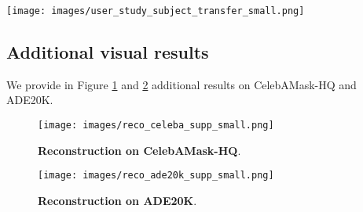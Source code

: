 \documentclass[runningheads]{llncs}
\begin{document}
\begin{figure*}[t!]
    \centering
    \texttt{[image: images/user\_study\_subject\_transfer\_small.png]}
     \caption{
     \small{\textbf{User study on subject transfer}. 
     We provide here the samples that were used to evaluate the subject quality on SCAM, SEAN and INADE in a user study. Note that we provide here the segmentation mask for reference but it was not provided to users.
     }}
    \label{fig:user_study_st}
\end{figure*}

\subsection{Additional visual results}
We provide in Figure \ref{fig:reco_celeb_supp} and \ref{fig:reco_ade20k_supp} additional results on CelebAMask-HQ and ADE20K.
\begin{figure}[h!]
    \centering
    \texttt{[image: images/reco\_celeba\_supp\_small.png]}
     \caption{
     \small{\textbf{Reconstruction on CelebAMask-HQ}. 
    }}
    \label{fig:reco_celeb_supp}
\end{figure}


\begin{figure}[h!]
    \centering
    \texttt{[image: images/reco\_ade20k\_supp\_small.png]}
     \caption{
     \small{\textbf{Reconstruction on ADE20K}. 
     }}
    \label{fig:reco_ade20k_supp}
\end{figure} 
\end{document}
